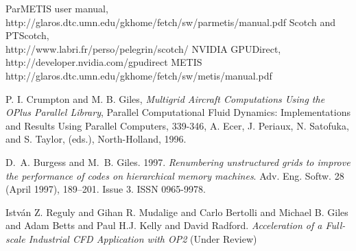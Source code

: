 \documentclass[11pt]{article}
\begin{document}
\begin{thebibliography}{4}
 ParMETIS user manual,\\http://glaros.dtc.umn.edu/gkhome/fetch/sw/parmetis/manual.pdf
 Scotch and PTScotch,\\http://www.labri.fr/perso/pelegrin/scotch/
 NVIDIA GPUDirect, \\http://developer.nvidia.com/gpudirect
 METIS \\http://glaros.dtc.umn.edu/gkhome/fetch/sw/metis/manual.pdf

 P. I. Crumpton and M. B. Giles, \textit{Multigrid {A}ircraft {C}omputations {U}sing the {OP}lus
{P}arallel {L}ibrary}, Parallel Computational Fluid Dynamics: Implementations and Results Using Parallel
Computers, 339-346, {A}. Ecer, J. Periaux, N. Satofuka, and S. Taylor, (eds.), North-Holland, 1996.

 D.~A. Burgess and M.~B. Giles. 1997. \textit{Renumbering unstructured grids to
improve the   performance of codes on hierarchical memory machines}. Adv. Eng. Softw. 28 (April 1997), 189--201.
Issue 3. ISSN 0965-9978.


 Istv\'an Z. Reguly and Gihan R. Mudalige and Carlo Bertolli and Michael B. Giles and Adam Betts
and Paul H.J. Kelly and David Radford. \textit{Acceleration of a Full-scale Industrial CFD Application with OP2} (Under
Review)
\end{thebibliography}
\end{document}

